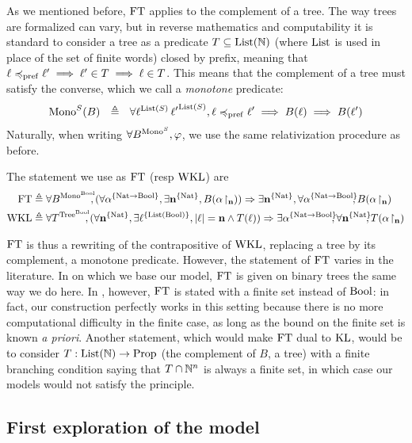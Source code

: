 \documentclass[a4paper,UKenglish,cleveref, autoref, thm-restate]{lipics-v2021}
\begin{document}
As we mentioned before, $\mathrm{FT}$ applies to the complement of a tree.
The way trees are formalized can vary, but in reverse mathematics and computability
it is standard to consider a tree as a predicate $T \subseteq \mathrm{List}(\mathbb N)$
(where $\mathrm{List}$ is used in place of the set of finite words) closed by prefix,
meaning that $\ell \preccurlyeq_{\mathrm{pref}} \ell' \implies \ell' \in T \implies \ell \in T$.
This means that the complement of a tree must satisfy the converse,
which we call a \emph{monotone} predicate:
\[\mathrm{Mono}^S(B)~~ \triangleq~~ \forall \ell^{\mathrm{List}(S)}\,{\ell'}^{\mathrm{List}(S)}, \ell \preccurlyeq_{\mathrm{pref}} \ell' \implies B(\ell) \implies B(\ell')\]
Naturally, when writing $\forall B^{\mathrm{Mono}^S}, \varphi$, we use the same relativization procedure as before.

The statement we use as $\mathrm{FT}$ (resp $\mathrm{WKL}$) are
\begin{align*}
\FT&\defeq \forall B^{\Mono^\Bool}\!\!\!, (\forall \alpha^{\{\Nat \to \Bool\}}, \exists \varn^{\{\Nat\}}, B(\restr\alpha \varn)) \Rightarrow
\exists \varn^{\{\Nat\}}, \forall \alpha^{\{\Nat\to\Bool\}}\!\!\!, B(\restr \alpha \varn)\\
\WKL&\defeq\forall T^{\Tree^\Bool}\!\!\!, (\forall \varn^{\{\Nat\}}, \exists \ell^{\{\List(\Bool)\}}, |\ell| = \varn \land T(\ell)) \Rightarrow
        \exists \alpha^{\{\Nat \to \Bool\}}\!\!\!, \forall \varn^{\{\Nat\}}\!\!\!, T(\restr \alpha \varn)
\end{align*}





$\mathrm{FT}$ is thus a rewriting of the contrapositive of $\mathrm{WKL}$, replacing a tree by its complement, a monotone predicate. However, the statement of $\mathrm{FT}$ varies in the literature. In \cite{LubRat13} on which we base our model, $\mathrm{FT}$ is given on binary trees the same way we do here. In \cite{BreHer21}, however, $\mathrm{FT}$ is stated with a finite set instead of $\mathrm{Bool}$: in fact, our construction perfectly works in this setting because there is no more computational difficulty in the finite case, as long as the bound on the finite set is known \textit{a priori}. Another statement, which would make $\mathrm{FT}$ dual to $\mathrm{KL}$, would be to consider $T : \mathrm{List}(\mathbb N) \to \mathrm{Prop}$ (the complement of $B$, a tree) with a finite branching condition saying that $T \cap \mathbb N^n$ is always a finite set, in which case our models would not satisfy the principle.

\subsection{First exploration of the model}
\end{document}
